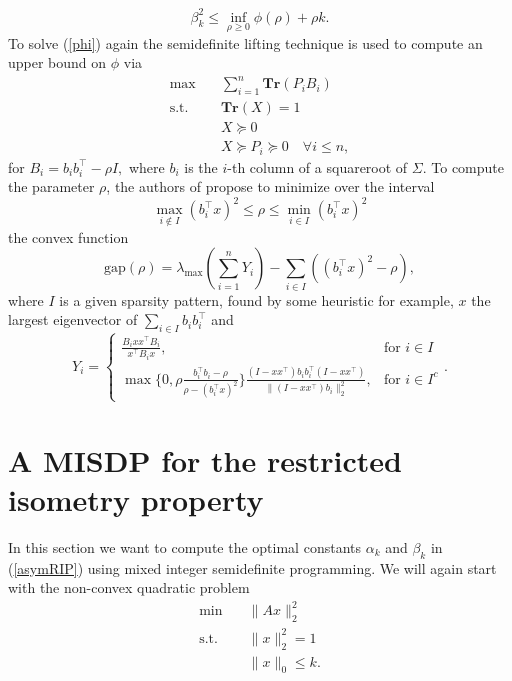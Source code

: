 \documentclass[a4paper,11pt,1p]{elsarticle}
\newcommand{\T}{^{\top}}
\begin{document}
\begin{equation*}
 \beta_k^2 \leq \inf_{\rho \geq 0} \phi(\rho) + \rho k.
\end{equation*}
To solve (\ref{phi}) again the semidefinite lifting technique is used to compute an upper bound on $\phi$ via
\begin{align}\label{Asp08}
 \text{max} \quad & \sum_{i=1}^n\textbf{Tr}(P_iB_i) \nonumber \\
 \text{s.t.} \quad & \textbf{Tr}(X) = 1 \nonumber \\
 & X \succeq 0 \tag{Asp08} \\
 & X \succeq P_i \succeq 0 \quad \forall i \leq n, \nonumber
\end{align}
for $B_i = b_ib_i\T - \rho I,$ where $b_i$ is the $i$-th column of a squareroot of $\Sigma$. To compute the parameter $\rho$, the authors of \cite{Asp07} propose to minimize over the interval
\begin{equation*}
 \max_{i \notin I} (b_i\T x)^2 \leq \rho \leq  \min_{i \in I} (b_i\T x)^2
\end{equation*}
the convex function
\begin{equation*}
 \text{gap}(\rho) = \lambda_{\max} \left( \sum_{i=1}^n Y_i \right) -
 \sum_{i \in I} ((b_i\T x)^2 - \rho),
\end{equation*}
where $I$ is a given sparsity pattern, found by some heuristic for example, $x$ the largest eigenvector of $\sum_{i \in I} b_i b_i\T$ and
\begin{equation*}
 Y_i = \begin{cases}\frac{B_ixx\T B_i}{x\T B_ix}, & \text{for } i \in I \\
   \max\{0, \rho \frac{b_i\T b_i - \rho}{\rho - (b_i\T x)^2} \} \frac{(I-xx\T)b_ib_i\T(I-xx\T)}{\|(I-xx\T)b_i\|_2^2}, & \text{for } i \in I^c\end{cases}. 
\end{equation*}


\section{A MISDP for the restricted isometry property}

In this section we want to compute the optimal constants $\alpha_k$ and $\beta_k$ in (\ref{asymRIP}) using mixed integer semidefinite programming. We will again start with the non-convex quadratic problem
\begin{align}\label{QP2}
 \text{min} \quad & \|Ax\|_2^2 \nonumber \\
 \text{s.t.} \quad & \|x\|_2^2 = 1 \tag{QP} \\
 & \|x\|_0 \leq k. \nonumber
\end{align}
\end{document}
